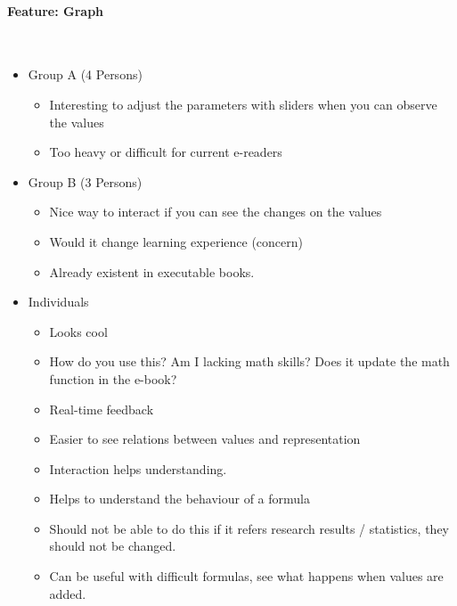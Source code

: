 \documentclass[main.tex]{subfiles}
\begin{document}
\paragraph{Feature: Graph}~
\begin{itemize}
	\item Group A (4 Persons)
		\begin{itemize}
			\item Interesting to adjust the parameters with sliders when you can observe the values
			\item Too heavy or difficult for current e-readers
		\end{itemize}
	\item Group B (3 Persons)
		\begin{itemize}
			\item Nice way to interact if you can see the changes on the values
			\item Would it change learning experience (concern)
			\item Already existent in executable books.
		\end{itemize}
	\item Individuals
		\begin{itemize}
      \item Looks cool %
      \item How do you use this? Am I lacking math skills? Does it update the math function in the e-book? %
			\item Real-time feedback
			\item Easier to see relations between values and representation
			\item Interaction helps understanding.
			\item Helps to understand the behaviour of a formula
 			\item Should not be able to do this if it refers research results / statistics, they should not be changed. 
			\item Can be useful with difficult formulas, see what happens when values are added.
		\end{itemize}
\end{itemize}
\end{document}
